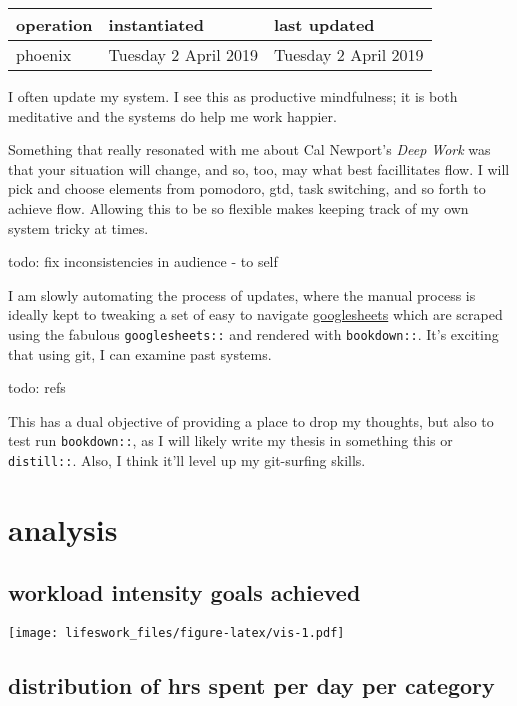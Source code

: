 \documentclass[]{book}
\begin{document}
\begin{longtable}[]{@{}lll@{}}
\toprule
operation & instantiated & last updated\tabularnewline
\midrule
\endhead
phoenix & Tuesday 2 April 2019 & Tuesday 2 April 2019\tabularnewline
\bottomrule
\end{longtable}

I often update my system. I see this as productive mindfulness; it is both meditative and the systems do help me work happier.

Something that really resonated with me about Cal Newport's \emph{Deep Work} was that your situation will change, and so, too, may what best facillitates flow. I will pick and choose elements from pomodoro, gtd, task switching, and so forth to achieve flow. Allowing this to be so flexible makes keeping track of my own system tricky at times.

todo: fix inconsistencies in audience - to self

I am slowly automating the process of updates, where the manual process is ideally kept to tweaking a set of easy to navigate \href{https://docs.google.com/spreadsheets/d/1hv7pkBGu8XQQOIBbBt1_1LvKGBR7zTdQYCzogrv3hz0/edit?usp=sharing}{googlesheets} which are scraped using the fabulous \texttt{googlesheets::} and rendered with \texttt{bookdown::}. It's exciting that using git, I can examine past systems.

todo: refs

This has a dual objective of providing a place to drop my thoughts, but also to test run \texttt{bookdown::}, as I will likely write my thesis in something this or \texttt{distill::}. Also, I think it'll level up my git-surfing skills.

\hypertarget{analysis}{%
\chapter{analysis}\label{analysis}}

\hypertarget{workload-intensity-goals-achieved}{%
\section{workload intensity goals achieved}\label{workload-intensity-goals-achieved}}

\texttt{[image: lifeswork\_files/figure-latex/vis-1.pdf]}

\hypertarget{distribution-of-hrs-spent-per-day-per-category}{%
\section{distribution of hrs spent per day per category}\label{distribution-of-hrs-spent-per-day-per-category}}
\end{document}
